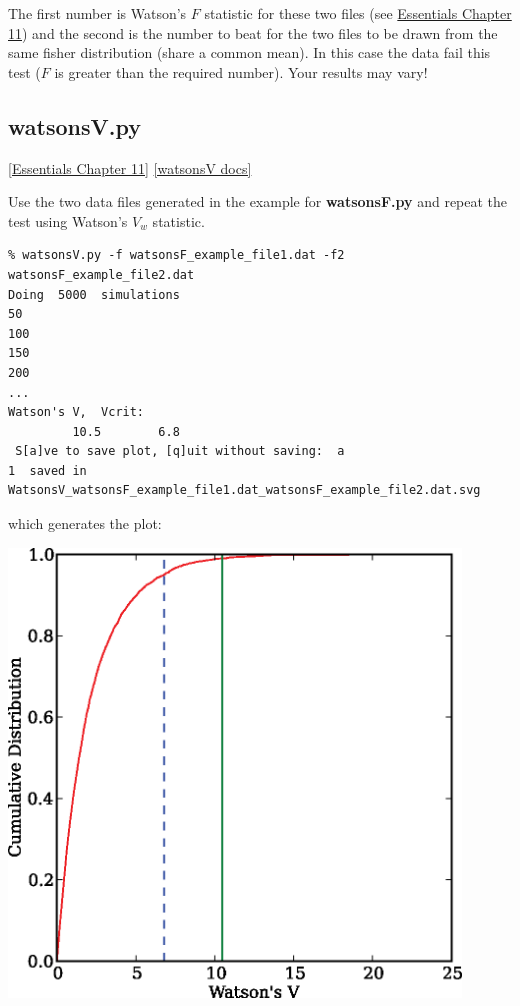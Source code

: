 \documentclass[11pt]{book}
\begin{document}
{{The first number is Watson's  $F$ statistic for these two files (see \href{http://magician.ucsd.edu/Essentials_2/WebBook2ch11.html#ch11}{Essentials Chapter 11}) and the second is the number to beat for the two files to be drawn from the same fisher distribution (share a common mean).   In this case  the data fail this test ($F$ is greater than the required number).    Your results may vary! 

\subsection{watsonsV.py} 
\href{http://magician.ucsd.edu/Essentials_2/WebBook2ch11.html#ch11}{[Essentials Chapter 11]}
\href{http://earthref.org/PmagPy/pmagpydocs/watsonsV-module.html}{[watsonsV docs]}


Use the two data files generated in the example for {\bf watsonsF.py} and repeat the test using Watson's $V_w$ statistic.

\begin{verbatim}
% watsonsV.py -f watsonsF_example_file1.dat -f2 watsonsF_example_file2.dat 
Doing  5000  simulations
50
100
150
200
...
Watson's V,  Vcrit: 
         10.5        6.8
 S[a]ve to save plot, [q]uit without saving:  a
1  saved in  WatsonsV_watsonsF_example_file1.dat_watsonsF_example_file2.dat.svg
       \end{verbatim}
 
\noindent  which generates the plot:
 

\includegraphics[width=12cm]{EPSfiles/watsonsV_example.eps}
 
}}
\end{document}
